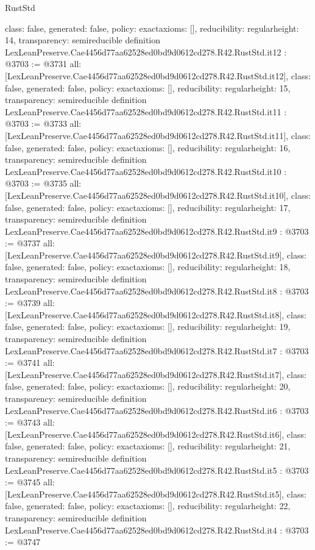 \begin{lexlean}{RustStd}
\begin{coremodule}
{  class: false,
  generated: false,
  policy: exact{axioms: []},
  reducibility: regular{height: 14},
  transparency: semireducible
}
definition LexLeanPreserve.Cae4456d77aa62528ed0bd9d0612cd278.R42.RustStd.it12 : @3703 := @3731 {
  all: [LexLeanPreserve.Cae4456d77aa62528ed0bd9d0612cd278.R42.RustStd.it12],
  class: false,
  generated: false,
  policy: exact{axioms: []},
  reducibility: regular{height: 15},
  transparency: semireducible
}
definition LexLeanPreserve.Cae4456d77aa62528ed0bd9d0612cd278.R42.RustStd.it11 : @3703 := @3733 {
  all: [LexLeanPreserve.Cae4456d77aa62528ed0bd9d0612cd278.R42.RustStd.it11],
  class: false,
  generated: false,
  policy: exact{axioms: []},
  reducibility: regular{height: 16},
  transparency: semireducible
}
definition LexLeanPreserve.Cae4456d77aa62528ed0bd9d0612cd278.R42.RustStd.it10 : @3703 := @3735 {
  all: [LexLeanPreserve.Cae4456d77aa62528ed0bd9d0612cd278.R42.RustStd.it10],
  class: false,
  generated: false,
  policy: exact{axioms: []},
  reducibility: regular{height: 17},
  transparency: semireducible
}
definition LexLeanPreserve.Cae4456d77aa62528ed0bd9d0612cd278.R42.RustStd.it9 : @3703 := @3737 {
  all: [LexLeanPreserve.Cae4456d77aa62528ed0bd9d0612cd278.R42.RustStd.it9],
  class: false,
  generated: false,
  policy: exact{axioms: []},
  reducibility: regular{height: 18},
  transparency: semireducible
}
definition LexLeanPreserve.Cae4456d77aa62528ed0bd9d0612cd278.R42.RustStd.it8 : @3703 := @3739 {
  all: [LexLeanPreserve.Cae4456d77aa62528ed0bd9d0612cd278.R42.RustStd.it8],
  class: false,
  generated: false,
  policy: exact{axioms: []},
  reducibility: regular{height: 19},
  transparency: semireducible
}
definition LexLeanPreserve.Cae4456d77aa62528ed0bd9d0612cd278.R42.RustStd.it7 : @3703 := @3741 {
  all: [LexLeanPreserve.Cae4456d77aa62528ed0bd9d0612cd278.R42.RustStd.it7],
  class: false,
  generated: false,
  policy: exact{axioms: []},
  reducibility: regular{height: 20},
  transparency: semireducible
}
definition LexLeanPreserve.Cae4456d77aa62528ed0bd9d0612cd278.R42.RustStd.it6 : @3703 := @3743 {
  all: [LexLeanPreserve.Cae4456d77aa62528ed0bd9d0612cd278.R42.RustStd.it6],
  class: false,
  generated: false,
  policy: exact{axioms: []},
  reducibility: regular{height: 21},
  transparency: semireducible
}
definition LexLeanPreserve.Cae4456d77aa62528ed0bd9d0612cd278.R42.RustStd.it5 : @3703 := @3745 {
  all: [LexLeanPreserve.Cae4456d77aa62528ed0bd9d0612cd278.R42.RustStd.it5],
  class: false,
  generated: false,
  policy: exact{axioms: []},
  reducibility: regular{height: 22},
  transparency: semireducible
}
definition LexLeanPreserve.Cae4456d77aa62528ed0bd9d0612cd278.R42.RustStd.it4 : @3703 := @3747 {
}
\end{coremodule}
\end{lexlean}
